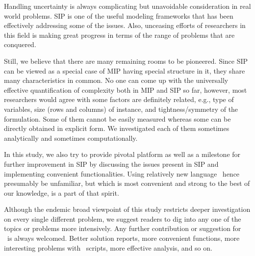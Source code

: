 Handling uncertainty is always complicating but unavoidable consideration in real world problems. SIP is one of the useful modeling frameworks that has been effectively addressing some of the issues. Also, unceasing efforts of researchers in this field is making great progress in terms of the range of problems that are conquered. 

Still, we believe that there are many remaining rooms to be pioneered. Since SIP can be viewed as a special case of MIP having special structure in it, they share many characteristics in common. No one can come up with the universally effective quantification of complexity both in MIP and SIP so far, however, most researchers would agree with some factors are definitely related, e.g., type of variables, size (rows and columns) of instance, and tightness/symmetry of the formulation. Some of them cannot be easily measured whereas some can be directly obtained in explicit form. We investigated each of them sometimes analytically and sometimes computationally.

In this study, we also try to provide pivotal platform as well as a milestone for further improvement in SIP by discussing the issues present in SIP and implementing convenient functionalities. Using relatively new language \julia\ hence presumably be unfamiliar, but which is most convenient and strong to the best of our knowledge, is a part of that spirit. 

Although the endemic broad viewpoint of this study restricts deeper investigation on every single different problem, we suggest readers to dig into any one of the topics or problems more intensively. Any further contribution or suggestion for \siplibtwo\ is always welcomed. Better solution reports, more convenient functions, more interesting problems with \julia\ scripts, more effective analysis, and so on.

